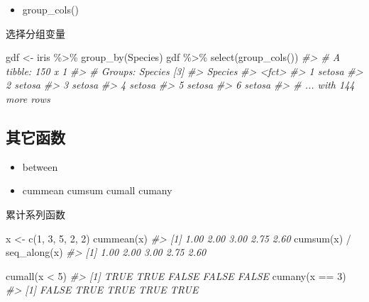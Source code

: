 \documentclass[
]{book}
\newenvironment{Shaded}{\begin{snugshade}}{\end{snugshade}}
\newcommand{\CommentTok}[1]{\textcolor[rgb]{0.56,0.35,0.01}{\textit{#1}}}
\newcommand{\DecValTok}[1]{\textcolor[rgb]{0.00,0.00,0.81}{#1}}
\newcommand{\FunctionTok}[1]{\textcolor[rgb]{0.00,0.00,0.00}{#1}}
\newcommand{\NormalTok}[1]{#1}
\newcommand{\OtherTok}[1]{\textcolor[rgb]{0.56,0.35,0.01}{#1}}
\newcommand{\SpecialCharTok}[1]{\textcolor[rgb]{0.00,0.00,0.00}{#1}}
\providecommand{\tightlist}{%
  \setlength{\itemsep}{0pt}\setlength{\parskip}{0pt}}
\begin{document}
\begin{itemize}
\tightlist
\item
  group\_cols()
\end{itemize}

选择分组变量

\begin{Shaded}
\begin{Highlighting}[]
\NormalTok{gdf }\OtherTok{\textless{}{-}}\NormalTok{ iris }\SpecialCharTok{\%\textgreater{}\%} \FunctionTok{group\_by}\NormalTok{(Species)}
\NormalTok{gdf }\SpecialCharTok{\%\textgreater{}\%} \FunctionTok{select}\NormalTok{(}\FunctionTok{group\_cols}\NormalTok{())}
\CommentTok{\#\textgreater{} \# A tibble: 150 x 1}
\CommentTok{\#\textgreater{} \# Groups:   Species [3]}
\CommentTok{\#\textgreater{}   Species}
\CommentTok{\#\textgreater{}   \textless{}fct\textgreater{}  }
\CommentTok{\#\textgreater{} 1 setosa }
\CommentTok{\#\textgreater{} 2 setosa }
\CommentTok{\#\textgreater{} 3 setosa }
\CommentTok{\#\textgreater{} 4 setosa }
\CommentTok{\#\textgreater{} 5 setosa }
\CommentTok{\#\textgreater{} 6 setosa }
\CommentTok{\#\textgreater{} \# ... with 144 more rows}
\end{Highlighting}
\end{Shaded}

\hypertarget{ux5176ux5b83ux51fdux6570}{%
\subsection{其它函数}\label{ux5176ux5b83ux51fdux6570}}

\begin{itemize}
\item
  between
\item
  cummean cumsum cumall cumany
\end{itemize}

累计系列函数

\begin{Shaded}
\begin{Highlighting}[]
\NormalTok{x }\OtherTok{\textless{}{-}} \FunctionTok{c}\NormalTok{(}\DecValTok{1}\NormalTok{, }\DecValTok{3}\NormalTok{, }\DecValTok{5}\NormalTok{, }\DecValTok{2}\NormalTok{, }\DecValTok{2}\NormalTok{)}
\FunctionTok{cummean}\NormalTok{(x)}
\CommentTok{\#\textgreater{} [1] 1.00 2.00 3.00 2.75 2.60}
\FunctionTok{cumsum}\NormalTok{(x) }\SpecialCharTok{/} \FunctionTok{seq\_along}\NormalTok{(x)}
\CommentTok{\#\textgreater{} [1] 1.00 2.00 3.00 2.75 2.60}

\FunctionTok{cumall}\NormalTok{(x }\SpecialCharTok{\textless{}} \DecValTok{5}\NormalTok{)}
\CommentTok{\#\textgreater{} [1]  TRUE  TRUE FALSE FALSE FALSE}
\FunctionTok{cumany}\NormalTok{(x }\SpecialCharTok{==} \DecValTok{3}\NormalTok{)}
\CommentTok{\#\textgreater{} [1] FALSE  TRUE  TRUE  TRUE  TRUE}
\end{Highlighting}
\end{Shaded}
\end{document}
